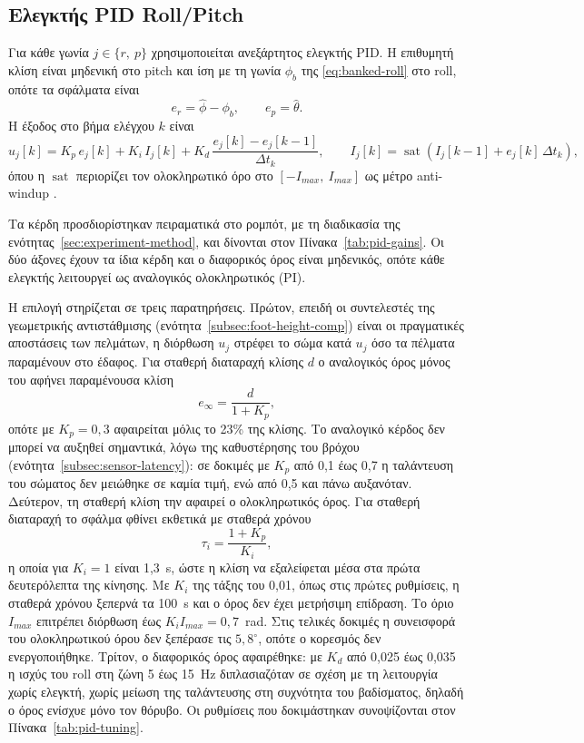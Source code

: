 \documentclass[11pt]{report}
\begin{document}
\subsection{Ελεγκτής PID Roll/Pitch}
Για κάθε γωνία $j \in \{r,\ p\}$ χρησιμοποιείται ανεξάρτητος ελεγκτής PID. Η
επιθυμητή κλίση είναι μηδενική στο pitch και ίση με τη γωνία $\phi_b$ της
\eqref{eq:banked-roll} στο roll, οπότε τα σφάλματα είναι
\begin{equation}
e_r = \hat{\phi} - \phi_b, \qquad e_p = \hat{\theta}.
\label{eq:pid-error}
\end{equation}
Η έξοδος στο βήμα ελέγχου $k$ είναι
\begin{equation}
u_j[k] = K_p\,e_j[k] + K_i\,I_j[k] + K_d\,\frac{e_j[k] - e_j[k-1]}{\Delta t_k},
\qquad
I_j[k] = \operatorname{sat}\!\left(I_j[k-1] + e_j[k]\,\Delta t_k\right),
\label{eq:pid-output}
\end{equation}
όπου η $\operatorname{sat}$ περιορίζει τον ολοκληρωτικό όρο στο
$[-I_{max},\ I_{max}]$ ως μέτρο anti-windup \cite{caparroz_antiwindup_2026}.

Τα κέρδη προσδιορίστηκαν πειραματικά στο ρομπότ, με τη διαδικασία της
ενότητας~\ref{sec:experiment-method}, και δίνονται στον
Πίνακα~\ref{tab:pid-gains}. Οι δύο άξονες έχουν τα ίδια κέρδη και ο διαφορικός
όρος είναι μηδενικός, οπότε κάθε ελεγκτής λειτουργεί ως αναλογικός ολοκληρωτικός
(PI).

Η επιλογή στηρίζεται σε τρεις παρατηρήσεις. Πρώτον, επειδή οι συντελεστές της
γεωμετρικής αντιστάθμισης (ενότητα~\ref{subsec:foot-height-comp}) είναι οι
πραγματικές αποστάσεις των πελμάτων, η διόρθωση $u_j$ στρέφει το σώμα κατά $u_j$
όσο τα πέλματα παραμένουν στο έδαφος. Για σταθερή διαταραχή κλίσης $d$ ο
αναλογικός όρος μόνος του αφήνει παραμένουσα κλίση
\begin{equation}
e_\infty = \frac{d}{1 + K_p},
\label{eq:p-residual}
\end{equation}
οπότε με $K_p = 0{,}3$ αφαιρείται μόλις το 23\% της κλίσης. Το αναλογικό κέρδος
δεν μπορεί να αυξηθεί σημαντικά, λόγω της καθυστέρησης του βρόχου
(ενότητα~\ref{subsec:sensor-latency}): σε δοκιμές με $K_p$ από 0,1 έως 0,7 η
ταλάντευση του σώματος δεν μειώθηκε σε καμία τιμή, ενώ από 0,5 και πάνω
αυξανόταν. Δεύτερον, τη σταθερή κλίση την αφαιρεί ο ολοκληρωτικός όρος. Για
σταθερή διαταραχή το σφάλμα φθίνει εκθετικά με σταθερά χρόνου
\begin{equation}
\tau_i = \frac{1 + K_p}{K_i},
\label{eq:pi-time-constant}
\end{equation}
η οποία για $K_i = 1$ είναι 1,3~s, ώστε η κλίση να εξαλείφεται μέσα στα πρώτα
δευτερόλεπτα της κίνησης. Με $K_i$ της τάξης του 0,01, όπως στις πρώτες
ρυθμίσεις, η σταθερά χρόνου ξεπερνά τα 100~s και ο όρος δεν έχει μετρήσιμη
επίδραση. Το όριο $I_{max}$ επιτρέπει διόρθωση έως $K_i I_{max} = 0{,}7$~rad.
Στις τελικές δοκιμές η συνεισφορά του ολοκληρωτικού όρου δεν ξεπέρασε τις
$5{,}8^\circ$, οπότε ο κορεσμός δεν ενεργοποιήθηκε. Τρίτον, ο διαφορικός όρος
αφαιρέθηκε: με $K_d$ από 0,025 έως 0,035 η ισχύς του roll στη ζώνη 5 έως 15~Hz
διπλασιαζόταν σε σχέση με τη λειτουργία χωρίς ελεγκτή, χωρίς μείωση της
ταλάντευσης στη συχνότητα του βαδίσματος, δηλαδή ο όρος ενίσχυε μόνο τον
θόρυβο. Οι ρυθμίσεις που δοκιμάστηκαν συνοψίζονται στον
Πίνακα~\ref{tab:pid-tuning}.
\end{document}
